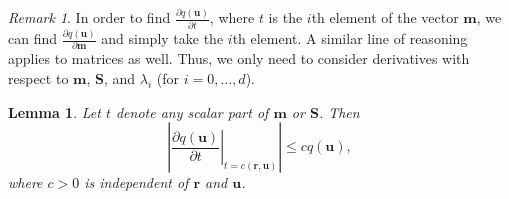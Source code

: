 \documentclass{article}
\newtheorem{lemma}[theorem]{Lemma}
\theoremstyle{definition}
\theoremstyle{remark}
\newtheorem*{remark}{Remark}
\begin{document}
\begin{remark}
  In order to find $\frac{\partial q(\mathbf{u})}{\partial t}$,
  where $t$ is the $i$th element of the vector $\mathbf{m}$, we can
  find $\frac{\partial q(\mathbf{u})}{\partial \mathbf{m}}$ and simply take the
  $i$th element. A similar line of reasoning applies to matrices as well. Thus,
  we only need to consider derivatives with respect to $\mathbf{m}$,
  $\mathbf{S}$, and $\lambda_i$ (for $i = 0, \dots, d$).
\end{remark}

\begin{lemma} \label{lemma:bound2}
  Let $t$ denote any scalar part of $\mathbf{m}$ or $\mathbf{S}$. Then
  \[ \left| \left. \frac{\partial q(\mathbf{u})}{\partial t} \right|_{t =
        c(\mathbf{r}, \mathbf{u})} \right| \le cq(\mathbf{u}), \]
  where $c > 0$ is independent of $\mathbf{r}$ and $\mathbf{u}$.
\end{lemma}
\end{document}
